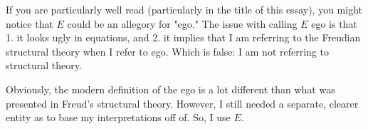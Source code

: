\documentclass{article}
\begin{document}
If you are particularly well read (particularly in the title of this essay), you
might notice that $E$ could be an allegory for "ego." The issue with calling $E$
ego is that 1. it looks ugly in equations, and 2. it implies that I am referring
to the Freudian structural theory when I refer to ego. Which is false: I am not
referring to structural theory.

Obviously, the modern definition of the ego is a lot different than what was
presented in Freud's structural theory. However, I still needed a separate,
clearer entity as to base my interpretations off of. So, I use $E$.
\end{document}
